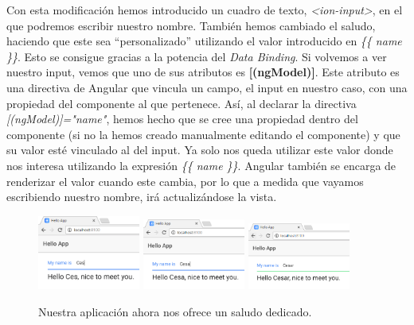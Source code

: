 Con esta modificación hemos introducido un cuadro de texto, \emph{<ion-input>}, en el que podremos escribir nuestro nombre. También hemos cambiado el saludo, haciendo que este sea ``personalizado'' utilizando el valor introducido en \emph{\{\{ name \}\}}. Esto se consigue gracias a la potencia del \emph{Data Binding}. Si volvemos a ver nuestro input, vemos que uno de sus atributos es \textbf{[(ngModel)]}. Este atributo es una directiva de Angular que vincula un campo, el input en nuestro caso, con una propiedad del componente al que pertenece. Así, al declarar la directiva \emph{[(ngModel)]="name"}, hemos hecho que se cree una propiedad dentro del componente (si no la hemos creado manualmente editando el componente) y que su valor esté vinculado al del input. Ya solo nos queda utilizar este valor donde nos interesa utilizando la expresión \emph{\{\{ name \}\}}. Angular también se encarga de renderizar el valor cuando este cambia, por lo que a medida que vayamos escribiendo nuestro nombre, irá actualizándose la vista.

\begin{figure}[H]
\centering
    \centering
        \includegraphics[width=0.3\textwidth]{Figures/ch2/HelloWorld/dyn_hello_world_1}
        \includegraphics[width=0.3\textwidth]{Figures/ch2/HelloWorld/dyn_hello_world_2}
        \includegraphics[width=0.3\textwidth]{Figures/ch2/HelloWorld/dyn_hello_world_3}
    \caption{Nuestra aplicación ahora nos ofrece un saludo dedicado.}
\end{figure}
